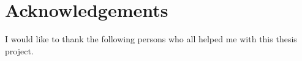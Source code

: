 \chapter{Acknowledgements}
\label{chap:acknowledgements}
I would like to thank the following persons who all helped me with this thesis project.

